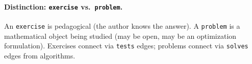 \paragraph{Distinction: \texttt{exercise} vs.\ \texttt{problem}.}
An \texttt{exercise} is pedagogical (the author knows the answer). A
\texttt{problem} is a mathematical object being studied (may be open, may
be an optimization formulation). Exercises connect via \texttt{tests} edges;
problems connect via \texttt{solves} edges from algorithms.
